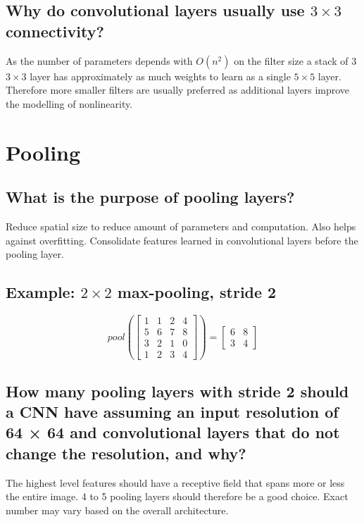 \subsection{Why do convolutional layers usually use $3 \times 3$ connectivity?}
As the number of parameters depends with $O(n^2)$ on the filter size a stack of 3 $3\times 3$ layer has approximately as much weights to learn as a single $5\times 5$ layer. Therefore more smaller filters are usually preferred as additional layers improve the modelling of nonlinearity.
%
\section{Pooling}
\begin{minipage}{0.5\textwidth}
\subsection{What is the purpose of pooling layers?}
Reduce spatial size to reduce amount of parameters and computation. Also helps against overfitting. Consolidate features learned in convolutional layers before the pooling layer.
\end{minipage}
\begin{minipage}{0.5\textwidth}
\subsection{Example:  $2 \times 2$ max-pooling, stride 2}
\begin{equation*}
pool\left(\begin{bmatrix}
1 & 1 & 2 & 4\\
5&6&7&8\\
3&2&1&0\\
1&2&3&4
\end{bmatrix}\right) = \begin{bmatrix}6 & 8 \\3 & 4\end{bmatrix}
\end{equation*}
\end{minipage}
\subsection{How many pooling layers with stride 2 should a CNN have assuming an input resolution of 64 × 64 and convolutional layers that do not change the resolution, and why?}
The highest level features should have a receptive field that spans more or less the entire image. 4 to 5 pooling layers should therefore be a good choice. Exact number may vary based on the overall architecture.
%
